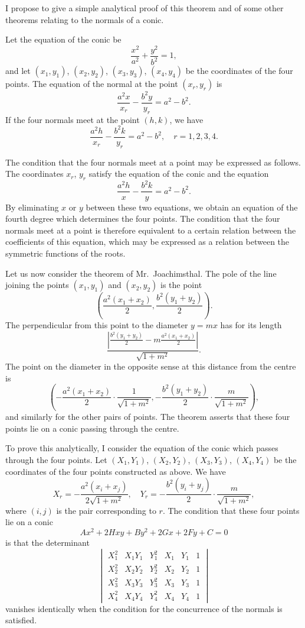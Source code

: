 \documentclass[11pt,a4paper]{book}
\begin{document}
I propose to give a simple analytical proof of this theorem and of some other theorems relating to the normals of a conic.

Let the equation of the conic be
\[
\frac{x^2}{a^2} + \frac{y^2}{b^2} = 1,
\]
and let $(x_1,y_1)$, $(x_2,y_2)$, $(x_3,y_3)$, $(x_4,y_4)$ be the coordinates of the four points. The equation of the normal at the point $(x_r,y_r)$ is
\[
\frac{a^2x}{x_r} - \frac{b^2y}{y_r} = a^2 - b^2.
\]
If the four normals meet at the point $(h,k)$, we have
\[
\frac{a^2h}{x_r} - \frac{b^2k}{y_r} = a^2 - b^2, \quad r=1,2,3,4.
\]

\setcounter{page}{76}

The condition that the four normals meet at a point may be expressed as follows. The coordinates $x_r$, $y_r$ satisfy the equation of the conic and the equation
\[
\frac{a^2h}{x} - \frac{b^2k}{y} = a^2 - b^2.
\]
By eliminating $x$ or $y$ between these two equations, we obtain an equation of the fourth degree which determines the four points. The condition that the four normals meet at a point is therefore equivalent to a certain relation between the coefficients of this equation, which may be expressed as a relation between the symmetric functions of the roots.

Let us now consider the theorem of Mr.~Joachimsthal. The pole of the line joining the points $(x_1,y_1)$ and $(x_2,y_2)$ is the point
\[
\left(\frac{a^2(x_1+x_2)}{2}, \frac{b^2(y_1+y_2)}{2}\right).
\]
The perpendicular from this point to the diameter $y = mx$ has for its length
\[
\frac{\left|\frac{b^2(y_1+y_2)}{2} - m\frac{a^2(x_1+x_2)}{2}\right|}{\sqrt{1+m^2}}.
\]
The point on the diameter in the opposite sense at this distance from the centre is
\[
\left(-\frac{a^2(x_1+x_2)}{2}\cdot\frac{1}{\sqrt{1+m^2}}, -\frac{b^2(y_1+y_2)}{2}\cdot\frac{m}{\sqrt{1+m^2}}\right),
\]
and similarly for the other pairs of points. The theorem asserts that these four points lie on a conic passing through the centre.

\setcounter{page}{77}

To prove this analytically, I consider the equation of the conic which passes through the four points. Let $(X_1,Y_1)$, $(X_2,Y_2)$, $(X_3,Y_3)$, $(X_4,Y_4)$ be the coordinates of the four points constructed as above. We have
\[
X_r = -\frac{a^2(x_i+x_j)}{2\sqrt{1+m^2}}, \quad
Y_r = -\frac{b^2(y_i+y_j)}{2}\cdot\frac{m}{\sqrt{1+m^2}},
\]
where $(i,j)$ is the pair corresponding to $r$. The condition that these four points lie on a conic
\[
Ax^2 + 2Hxy + By^2 + 2Gx + 2Fy + C = 0
\]
is that the determinant
\[
\begin{vmatrix}
X_1^2 & X_1Y_1 & Y_1^2 & X_1 & Y_1 & 1 \\
X_2^2 & X_2Y_2 & Y_2^2 & X_2 & Y_2 & 1 \\
X_3^2 & X_3Y_3 & Y_3^2 & X_3 & Y_3 & 1 \\
X_4^2 & X_4Y_4 & Y_4^2 & X_4 & Y_4 & 1
\end{vmatrix}
\]
vanishes identically when the condition for the concurrence of the normals is satisfied.
\end{document}
